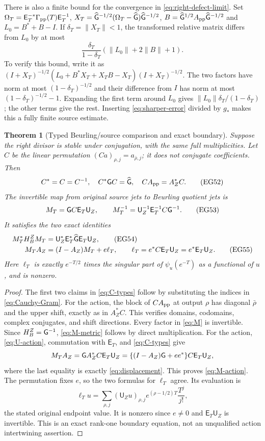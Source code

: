 \documentclass[11pt]{article}
\newtheorem{theorem}{Theorem}[section]
\newcommand{\U}{\mathsf U}\newcommand{\E}{\mathsf E}
\begin{document}
There is also a finite bound for the convergence in
\eqref{eq:right-defect-limit}. Set
$\Omega_T=\E_T^{-*}\Gamma_{\rm pp}(T)\E_T^{-1}$,
$X_T=\widehat{\mathsf G}^{-1/2}(\Omega_T-\widehat{\mathsf G})\widehat{\mathsf G}^{-1/2}$,
$B=\widehat{\mathsf G}^{1/2}A_{\rm pp}\widehat{\mathsf G}^{-1/2}$ and
$L_0=B^*+B-I$. If $\delta_T=\|X_T\|<1$, the transformed relative
matrix differs from $L_0$ by at most
\[
 \frac{\delta_T}{1-\delta_T}
                     (\|L_0\|+2\|B\|+1).
 \tag{EG51}\label{eq:defect-error}
\]
To verify this bound, write it as
$(I+X_T)^{-1/2}(L_0+B^*X_T+X_TB-X_T)(I+X_T)^{-1/2}$.
The two factors have norm at most $(1-\delta_T)^{-1/2}$ and their
difference from $I$ has norm at most $(1-\delta_T)^{-1/2}-1$.
Expanding the first term around $L_0$ gives
$\|L_0\|\delta_T/(1-\delta_T)$; the other terms give the rest.
Inserting \eqref{eq:sharper-error} divided by $g_*$ makes this a
fully finite source estimate.

\begin{theorem}[Typed Beurling/source comparison and exact boundary]
\label{thm:typed-boundary}
Suppose the right divisor is stable under conjugation, with the
same full multiplicities. Let $C$ be the linear permutation
$(Ca)_{\rho,j}=a_{\bar\rho,j}$; it does not conjugate coefficients.
Then
\[
 C^*=C=C^{-1},\quad C^*\mathsf G C=\widehat{\mathsf G},\quad
                         C A_{\rm pp}=A_Z^*C.
 \tag{EG52}\label{eq:C-types}
\]
The invertible map from original source jets to Beurling quotient
jets is
\[
 M_T=\G C\E_T\U_Z,\qquad
 M_T^{-1}=\U_Z^{-1}\E_T^{-1}C\G^{-1}.
 \tag{EG53}\label{eq:M}
\]
It satisfies the two exact identities
\begin{align}
 M_T^*H_B^ZM_T&=\U_Z^*\E_T^*\widehat\G\E_T\U_Z,
                                  \tag{EG54}\label{eq:M-metric}\\
 M_TA_Z&=(I-A_Z)M_T+e\ell_T,\qquad
 \ell_T=e^*C\E_T\U_Z=e^*\E_T\U_Z.
                                  \tag{EG55}\label{eq:M-action}
\end{align}
Here $\ell_T$ is exactly $e^{-T/2}$ times the singular part of
$\psi_u(e^{-T})$ as a functional of $u$, and is nonzero.
\end{theorem}
\begin{proof}
The first two claims in \eqref{eq:C-types} follow by substituting
the indices in \eqref{eq:Cauchy-Gram}. For the action, the block
of $C A_{\rm pp}$ at output $\rho$ has diagonal $\bar\rho$ and
the upper shift, exactly as in $A_Z^*C$. This verifies domains,
codomains, complex conjugates, and shift directions. Every factor
in \eqref{eq:M} is invertible. Since $H_B^Z=\mathsf G^{-1}$,
\eqref{eq:M-metric} follows by direct multiplication.
For the action, \eqref{eq:U-action}, commutation with $\E_T$, and
\eqref{eq:C-types} give
\[
 M_TA_Z=\G A_Z^*C\E_T\U_Z
       =\{(I-A_Z)\G+ee^*\}C\E_T\U_Z,
\]
where the last equality is exactly \eqref{eq:displacement}.
This proves \eqref{eq:M-action}. The permutation fixes $e$,
so the two formulas for $\ell_T$ agree. Its evaluation is
\[
 \ell_Tu=\sum_{\rho,j}(\U_Zu)_{\rho,j}
                e^{(\rho-1/2)T}\frac{T^j}{j!},
\]
the stated original endpoint value. It is nonzero since $e\ne0$
and $\E_T\U_Z$ is invertible. This is an exact rank-one boundary
equation, not an unqualified action intertwining assertion.
\end{proof}
\end{document}
